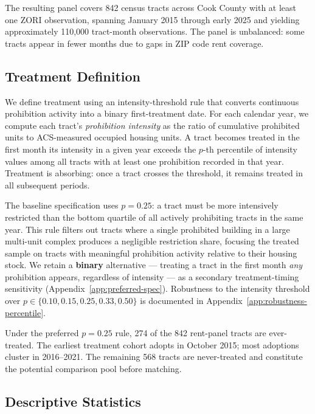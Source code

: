 The resulting panel covers 842 census tracts across Cook County with at least one ZORI observation, spanning January 2015 through early 2025 and yielding approximately 110,000 tract-month observations. The panel is unbalanced: some tracts appear in fewer months due to gaps in ZIP code rent coverage.

\subsection{Treatment Definition}\label{sec:data-treatment}

We define treatment using an intensity-threshold rule that converts continuous prohibition activity into a binary first-treatment date. For each calendar year, we compute each tract's \emph{prohibition intensity} as the ratio of cumulative prohibited units to ACS-measured occupied housing units. A tract becomes treated in the first month its intensity in a given year exceeds the $p$-th percentile of intensity values among all tracts with at least one prohibition recorded in that year. Treatment is absorbing: once a tract crosses the threshold, it remains treated in all subsequent periods.

The baseline specification uses $p = 0.25$: a tract must be more intensively restricted than the bottom quartile of all actively prohibiting tracts in the same year. This rule filters out tracts where a single prohibited building in a large multi-unit complex produces a negligible restriction share, focusing the treated sample on tracts with meaningful prohibition activity relative to their housing stock. We retain a \textbf{binary} alternative --- treating a tract in the first month \emph{any} prohibition appears, regardless of intensity --- as a secondary treatment-timing sensitivity (Appendix~\ref{app:preferred-spec}). Robustness to the intensity threshold over $p \in \{0.10, 0.15, 0.25, 0.33, 0.50\}$ is documented in Appendix~\ref{app:robustness-percentile}.

Under the preferred $p = 0.25$ rule, 274 of the 842 rent-panel tracts are ever-treated. The earliest treatment cohort adopts in October 2015; most adoptions cluster in 2016--2021. The remaining 568 tracts are never-treated and constitute the potential comparison pool before matching.

\subsection{Descriptive Statistics}


